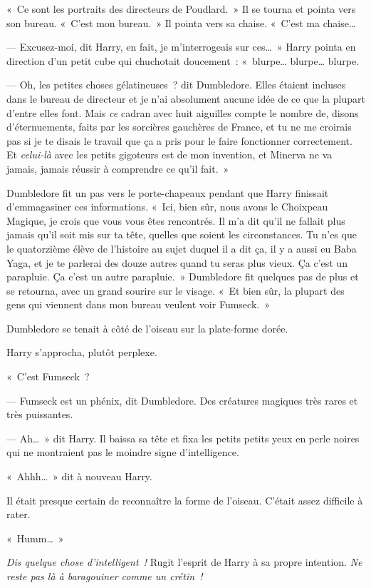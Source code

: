 «~Ce sont les portraits des directeurs de Poudlard.~» Il se tourna et pointa vers son bureau. «~C'est mon bureau.~» Il pointa vers sa chaise. «~C'est ma chaise…

--- Excusez-moi, dit Harry, en fait, je m'interrogeais sur ces…~» Harry pointa en direction d'un petit cube qui chuchotait doucement~: «~blurpe… blurpe… blurpe.

--- Oh, les petites choses gélatineuses~? dit Dumbledore. Elles étaient incluses dans le bureau de directeur et je n'ai absolument aucune idée de ce que la plupart d'entre elles font. Mais \emph{ce} cadran avec huit aiguilles compte le nombre de, disons d'éternuements, faits par les sorcières gauchères de France, et tu ne me croirais pas si je te disais le travail que ça a pris pour le faire fonctionner correctement. Et \emph{celui-là} avec les petits gigoteurs est de mon invention, et Minerva ne va jamais, jamais réussir à comprendre ce qu'il fait.~»

Dumbledore fit un pas vers le porte-chapeaux pendant que Harry finissait d'emmagasiner ces informations. «~Ici, bien sûr, nous avons le Choixpeau Magique, je crois que vous vous êtes rencontrés. Il m'a dit qu'il ne fallait plus jamais qu'il soit mis sur ta tête, quelles que soient les circonstances. Tu n'es que le quatorzième élève de l'histoire au sujet duquel il a dit ça, il y a aussi eu Baba Yaga, et je te parlerai des douze autres quand tu seras plus vieux. Ça c'est un parapluie. Ça c'est un autre parapluie.~» Dumbledore fit quelques pas de plus et se retourna, avec un grand sourire sur le visage. «~Et bien sûr, la plupart des gens qui viennent dans mon bureau veulent voir Fumseck.~»

Dumbledore se tenait à côté de l'oiseau sur la plate-forme dorée.

Harry s'approcha, plutôt perplexe.

«~C'est Fumseck~?

--- Fumseck est un phénix, dit Dumbledore. Des créatures magiques très rares et très puissantes.

--- Ah…~» dit Harry. Il baissa sa tête et fixa les petits petits yeux en perle noires qui ne montraient pas le moindre signe d'intelligence.

«~Ahhh…~» dit à nouveau Harry.

Il était presque certain de reconnaître la forme de l'oiseau. C'était assez difficile à rater.

«~Humm…~»

\emph{Dis quelque chose d'intelligent~!} Rugit l'esprit de Harry à sa propre intention. \emph{Ne reste pas là à baragouiner comme un crétin~!}

